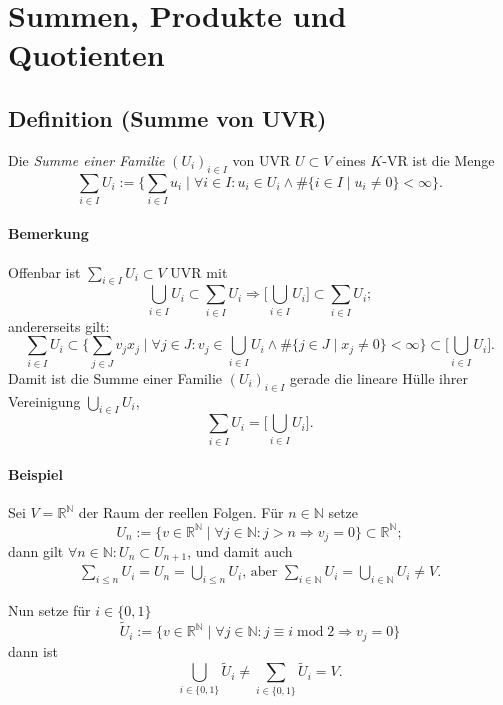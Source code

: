 \section{Summen, Produkte und Quotienten}
\subsection{Definition (Summe von UVR)}
	\begin{Definition}
		Die \emph{Summe einer Familie} $ (U_i)_{i\in I} $ von UVR $ U\subset V $ eines $ K $-VR ist die Menge
		\[
		\sum_{i\in I} U_i := \Big\{\sum_{i \in I}u_i\mid \forall i\in I: u_i\in U_i \land \# \{i\in I\mid u_i \neq 0\}<\infty\Big\}.
		\]
	\end{Definition}
		
\paragraph{Bemerkung}
	Offenbar ist $ \sum_{i\in I} U_i\subset V $ UVR mit
	\[  \bigcup_{i\in I}U_i \subset \sum_{i\in I} U_i \Rightarrow \Big[\bigcup_{i\in I}U_i\Big]\subset \sum_{i\in I} U_i; \]
	andererseits gilt:
	\[ \sum_{i\in I}U_i \subset \Big\{\sum_{j\in J}v_jx_j\mid \forall j\in J: v_j\in \bigcup_{i\in I}U_i \land \#\{j\in J\mid x_j\neq 0\}<\infty\Big\}\subset \Big[\bigcup_{i\in I}U_i\Big]. \]
	Damit ist die Summe einer Familie $ (U_i)_{i\in I} $ gerade die lineare Hülle ihrer Vereinigung $ \bigcup_{i\in I}U_i $,
	\[ \sum_{i\in I}U_i= \Big[\bigcup_{i\in I}U_i\Big]. \]
		
\paragraph{Beispiel}
	Sei $ V=\mathbb{R}^\mathbb{N} $ der Raum der reellen Folgen. Für $ n\in \mathbb{N} $ setze
		\[
		U_n := \{v\in \mathbb{R}^\mathbb{N}\mid \forall j\in \mathbb{N}: j>n\Rightarrow v_j = 0 \} \subset \mathbb{R}^\mathbb{N};
		\]
	dann gilt $ \forall n\in \mathbb{N}: U_n\subset U_{n+1} $, und damit auch
		\begin{gather*}
		\sum_{i\leq n} U_i = U_n = \bigcup_{i\leq n}U_i \text{, aber } \sum_{i\in \mathbb{N}}U_i = \bigcup_{i\in \mathbb{N}}U_i \neq V.
		\end{gather*}
		
	Nun setze für $ i\in \{0,1\} $
		\[
		\tilde{U}_i := \{v\in \mathbb{R}^\mathbb{N}\mid \forall j\in \mathbb{N}: j\equiv
i\operatorname{mod} 2\Rightarrow v_j = 0\}
		\]
	dann ist 
		\[
		\bigcup_{i\in \{0,1\}}\tilde{U}_i \neq \sum_{i\in \{0,1\}}\tilde{U}_i = V.
		\]
		
